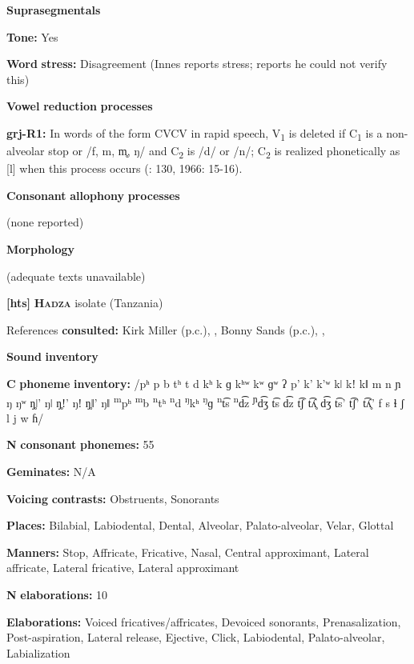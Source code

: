 \begin{styleBody}
\textbf{Suprasegmentals}

\textbf{Tone:} Yes

\textbf{Word} \textbf{stress:} Disagreement (Innes reports stress; \citealt{Newman1986} reports he could not verify this)

\textbf{Vowel} \textbf{reduction} \textbf{processes}

\textbf{grj-R1:} In words of the form CVCV in rapid speech, V\textsubscript{1} is deleted if C\textsubscript{1} is a non-alveolar stop or /f, m, m̥, ŋ/ and C\textsubscript{2} is /d/ or /n/; C\textsubscript{2} is realized phonetically as [l] when this process occurs (\citealt{Innes1981}: 130, 1966: 15-16).

\textbf{Consonant} \textbf{allophony} \textbf{processes}

(none reported)

\textbf{Morphology}

(adequate texts unavailable)

\textbf{[hts]}   \textbf{\textsc{Hadza}}  isolate (Tanzania)

References \textbf{consulted:} Kirk Miller (p.c.), \citet{Sands2013}, Bonny Sands (p.c.), \citet{SandsEtAl1996}, \citet{TuckerEtAl1977}

\textbf{Sound} \textbf{inventory}

\textbf{C} \textbf{phoneme} \textbf{inventory:} /pʰ p b tʰ t d kʰ k ɡ kʰʷ kʷ ɡʷ ʔ p’ k’ k’ʷ kǀ kǃ kǁ m n ɲ ŋ ŋʷ ŋ̥ǀ’ ŋǀ ŋ̥ǃ’ ŋǃ ŋ̥ǁ’ ŋǁ \textsuperscript{m}pʰ \textsuperscript{m}b \textsuperscript{n}tʰ \textsuperscript{n}d \textsuperscript{ŋ}kʰ \textsuperscript{ŋ}ɡ \textsuperscript{n}t͡s \textsuperscript{n}d͡z \textsuperscript{ɲ}d͡ʒ t͡s d͡z t͡ʃ t͡ʎ̥ d͡ʒ t͡s’ t͡ʃ’ t͡ʎ̥’ f s ɬ ʃ l j w ɦ/

\textbf{N} \textbf{consonant} \textbf{phonemes:} 55

\textbf{Geminates:} N/A

\textbf{Voicing} \textbf{contrasts:} Obstruents, Sonorants

\textbf{Places:} Bilabial, Labiodental, Dental, Alveolar, Palato-alveolar, Velar, Glottal

\textbf{Manners:} Stop, Affricate, Fricative, Nasal, Central approximant, Lateral affricate, Lateral fricative, Lateral approximant

\textbf{N} \textbf{elaborations:} 10

\textbf{Elaborations:} Voiced fricatives/affricates, Devoiced sonorants, Prenasalization, Post-aspiration, Lateral release, Ejective, Click, Labiodental, Palato-alveolar, Labialization


\end{styleBody}
